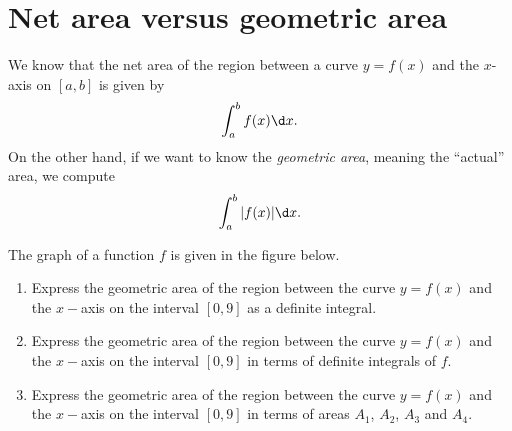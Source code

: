 \documentclass{ximera}
\begin{document}
\section{Net area versus geometric area}


We know that the net area of the region between a curve $y=f(x)$ and the $x$-axis
on $[a,b]$ is given by
\[
\int_a^b f(x) \d x.
\]
On the other hand, if we want to know the \textit{geometric area},
meaning the ``actual'' area, we compute
\[
\int_a^b |f(x)| \d x.
\]
\begin{example}
The graph of a function $f$ is given in the figure below.
 \begin{image}
\end{image}
\begin{enumerate}
\item Express the  geometric  area of the region between the curve $y=f(x)$ and the $x-$axis on the interval $[0,9]$ as a definite integral.
\item Express the  geometric  area of the region between the curve $y=f(x)$ and the $x-$axis on the interval $[0,9]$ in terms of  definite integrals of $f$.
\item Express the  geometric  area of the region between the curve $y=f(x)$ and the $x-$axis on the interval $[0,9]$ in terms of areas $A_1$, $A_2$, $A_3$ and $A_4$.


\end{enumerate}
\end{example}
\end{document}
